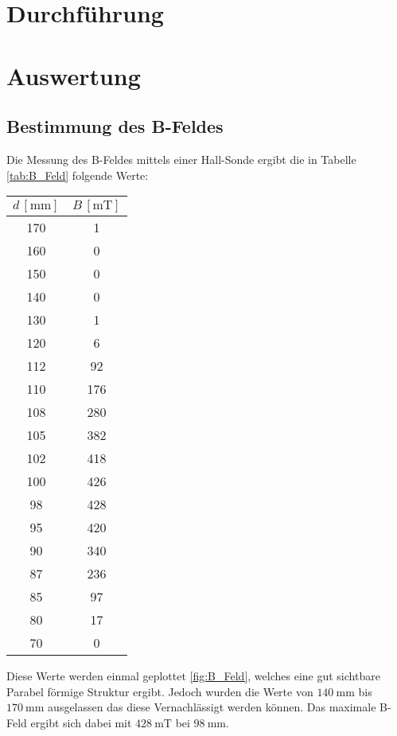 \section{Durchführung}


\newpage
\section{Auswertung}
\subsection{Bestimmung des B-Feldes}
Die Messung des B-Feldes mittels einer Hall-Sonde ergibt die in Tabelle \eqref{tab:B_Feld} folgende Werte:

\begin{table}[H]
	\centering
	\begin{tabular}{c c}
		\toprule
		$d \, [\unit{\milli\meter}]$ & $B \, [\unit{\milli\tesla}] $  \\
		\midrule
        170 & 1 \\
        160 & 0 \\
        150 & 0 \\
        140 & 0 \\
        130 & 1 \\
        120 & 6 \\
        112 & 92 \\
        110 & 176 \\
        108 & 280 \\
        105 & 382 \\
        102 & 418 \\
        100 & 426 \\
        98  & 428 \\
        95  & 420 \\
        90  & 340 \\
        87  & 236 \\
        85  & 97 \\
        80  & 17 \\
        70  & 0  \\
		\bottomrule
	\end{tabular}
    \label{tab:B_Feld}
\end{table}

Diese Werte werden einmal geplottet \eqref{fig:B_Feld}, welches eine gut sichtbare Parabel förmige Struktur ergibt. 
Jedoch wurden die Werte von $\qty{140}{\milli\meter}$ bis $\qty{170}{\milli\meter}$ ausgelassen das diese Vernachlässigt werden können. 
Das maximale B-Feld ergibt sich dabei mit $\qty{428}{\milli\tesla}$ bei $\qty{98}{\milli\meter}$. 

